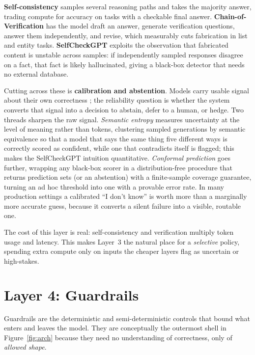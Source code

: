 \documentclass[11pt]{article}
\begin{document}
\textbf{Self-consistency} \citep{wang2023selfconsistency} samples several
reasoning paths and takes the majority answer, trading compute for accuracy on
tasks with a checkable final answer. \textbf{Chain-of-Verification}
\citep{dhuliawala2023cove} has the model draft an answer, generate verification
questions, answer them independently, and revise, which measurably cuts
fabrication in list and entity tasks. \textbf{SelfCheckGPT}
\citep{manakul2023selfcheckgpt} exploits the observation that fabricated content
is unstable across samples: if independently sampled responses disagree on a
fact, that fact is likely hallucinated, giving a black-box detector that needs
no external database.

Cutting across these is \textbf{calibration and abstention}. Models carry usable
signal about their own correctness \citep{kadavath2022know}; the reliability
question is whether the system converts that signal into a decision to abstain,
defer to a human, or hedge. Two threads sharpen the raw signal. \emph{Semantic
entropy} \citep{kuhn2023semantic} measures uncertainty at the level of meaning
rather than tokens, clustering sampled generations by semantic equivalence so
that a model that says the same thing five different ways is correctly scored as
confident, while one that contradicts itself is flagged; this makes the
SelfCheckGPT intuition quantitative. \emph{Conformal prediction}
\citep{angelopoulos2021conformal} goes further, wrapping any black-box scorer in a
distribution-free procedure that returns prediction sets (or an abstention) with a
finite-sample coverage guarantee, turning an ad hoc threshold into one with a
provable error rate. In many production settings a calibrated ``I don't know'' is
worth more than a marginally more accurate guess, because it converts a silent
failure into a visible, routable one.

The cost of this layer is real: self-consistency and verification multiply token
usage and latency. This makes Layer~3 the natural place for a \emph{selective}
policy, spending extra compute only on inputs the cheaper layers flag as
uncertain or high-stakes.

\section{Layer 4: Guardrails}
\label{sec:guardrails}

Guardrails are the deterministic and semi-deterministic controls that bound what
enters and leaves the model. They are conceptually the outermost shell in
Figure~\ref{fig:arch} because they need no understanding of correctness, only of
\emph{allowed shape}.
\end{document}
